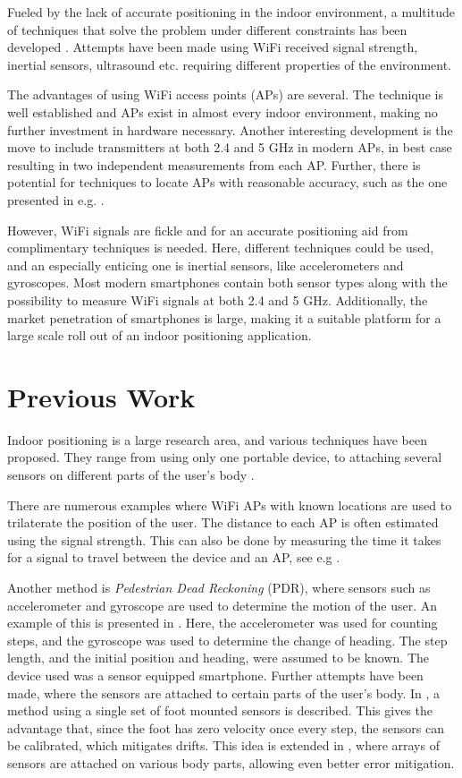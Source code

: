 \documentclass{LTHthesis}
\begin{document}
Fueled by the lack of accurate positioning in the indoor environment, a multitude of techniques that solve the problem under different constraints has been developed \cite{positioning_overview}. Attempts have been made using WiFi received signal strength, inertial sensors, ultrasound etc. requiring different properties of the environment. 

The advantages of using WiFi access points (APs) are several. The technique is well established and APs exist in almost every indoor environment, making no further investment in hardware necessary. Another interesting development is the move to include transmitters at both 2.4 and 5 GHz in modern APs, in best case resulting in two independent measurements from each AP. Further, there is potential for techniques to locate APs with reasonable accuracy, such as the one presented in e.g. \cite{exjobb}. 

However, WiFi signals are fickle and for an accurate positioning aid from complimentary techniques is needed. Here, different techniques could be used, and an especially enticing one is inertial sensors, like accelerometers and gyroscopes. Most modern smartphones contain both sensor types along with the possibility to measure WiFi signals at both 2.4 and 5 GHz. Additionally, the market penetration of smartphones is large, making it a suitable platform for a large scale roll out of an indoor positioning application.
%

\section{Previous Work}
Indoor positioning is a large research area, and various techniques have been proposed. They range from using only one portable device, to attaching several sensors on different parts of the user's body \cite{body_mounted}.

There are numerous examples where WiFi APs with known locations are used to trilaterate the position of the user. The distance to each AP is often estimated using the signal strength. This can also be done by measuring the time it takes for a signal to travel between the device and an AP, see e.g \cite{wlan_pos}.

Another method is \emph{Pedestrian Dead Reckoning} (PDR), where sensors such as accelerometer and gyroscope are used to determine the motion of the user. An example of this is presented in \cite{exjobb}. Here, the accelerometer was used for counting steps, and the gyroscope was used to determine the change of heading. The step length, and the initial position and heading, were assumed to be known. The device used was a sensor equipped smartphone. Further attempts have been made, where the sensors are attached to certain parts of the user's body. In \cite{foot_mounted}, a method using a single set of foot mounted sensors is described. This gives the advantage that, since the foot has zero velocity once every step, the sensors can be calibrated, which mitigates drifts. This idea is extended in \cite{body_mounted}, where arrays of sensors are attached on various body parts, allowing even better error mitigation.
\end{document}

